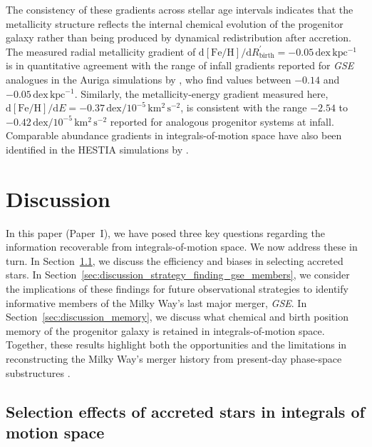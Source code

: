 \documentclass[fleqn,usenatbib]{mnras}
\newcommand{\changed}[1]{{{#1}}}
\begin{document}
\changed{The consistency of these gradients across stellar age intervals indicates that the metallicity structure reflects the internal chemical evolution of the progenitor galaxy rather than being produced by dynamical redistribution after accretion. The measured radial metallicity gradient of
$\mathrm{d[Fe/H]}/\mathrm{d}R_\mathrm{birth}^\prime = -0.05\,\mathrm{dex\,kpc^{-1}}$
is in quantitative agreement with the range of infall gradients reported for \textit{GSE} analogues in the Auriga simulations by \citet{Carrillo2026}, who find values between $-0.14$ and $-0.05\,\mathrm{dex\,kpc^{-1}}$. Similarly, the metallicity-energy gradient measured here,
$\mathrm{d[Fe/H]}/\mathrm{d}E = -0.37\,\mathrm{dex}/10^{-5}\,\mathrm{km^2\,s^{-2}}$,
is consistent with the range $-2.54$ to $-0.42\,\mathrm{dex}/10^{-5}\,\mathrm{km^2\,s^{-2}}$ reported for analogous progenitor systems at infall. Comparable abundance gradients in integrals-of-motion space have also been identified in the HESTIA simulations by \citet{Khoperskov2023c}.}

\section{Discussion}
\label{sec:discussion}

In this paper (Paper~I), we have posed three key questions regarding the information recoverable from integrals-of-motion space. We now address these in turn. In Section~\ref{sec:discussion_finding_accreted_stars}, we discuss the efficiency and biases in selecting accreted stars. In Section~\ref{sec:discussion_strategy_finding_gse_members}, we consider the implications of these findings for future observational strategies to identify informative members of the Milky Way’s last major merger, \textit{GSE}. In Section~\ref{sec:discussion_memory}, we discuss what chemical and birth position memory of the progenitor galaxy is retained in integrals-of-motion space. Together, these results highlight both the opportunities and the limitations in reconstructing the Milky Way’s merger history from present-day phase-space substructures \changed{\citep[see also][]{Thomas2025}}.

\subsection{Selection effects of accreted stars in integrals of motion space} \label{sec:discussion_finding_accreted_stars}
\end{document}
